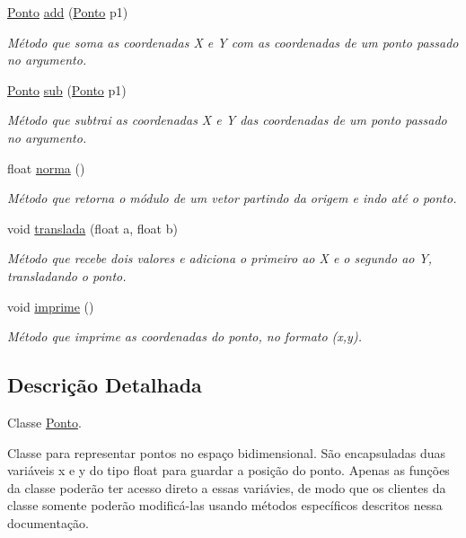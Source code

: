 \begin{DoxyCompactItemize}
\hyperlink{classPonto}{Ponto} \hyperlink{classPonto_abb68d6122278de262e8ed1c70714e3d9}{add} (\hyperlink{classPonto}{Ponto} p1)
\begin{DoxyCompactList}\small\item\em Método que soma as coordenadas X e Y com as coordenadas de um ponto passado no argumento. \end{DoxyCompactList}\item 
\hyperlink{classPonto}{Ponto} \hyperlink{classPonto_a8404fcad0fca2ce768ab9e1550f5d3a0}{sub} (\hyperlink{classPonto}{Ponto} p1)
\begin{DoxyCompactList}\small\item\em Método que subtrai as coordenadas X e Y das coordenadas de um ponto passado no argumento. \end{DoxyCompactList}\item 
float \hyperlink{classPonto_a9b0ddbdddd05edbc4d45ef0671a628c6}{norma} ()
\begin{DoxyCompactList}\small\item\em Método que retorna o módulo de um vetor partindo da origem e indo até o ponto. \end{DoxyCompactList}\item 
void \hyperlink{classPonto_a96a4395204ec010814e67d20705e630f}{translada} (float a, float b)
\begin{DoxyCompactList}\small\item\em Método que recebe dois valores e adiciona o primeiro ao X e o segundo ao Y, transladando o ponto. \end{DoxyCompactList}\item 
\mbox{\label{classPonto_a84758d453e38f237bdf860b6435e9def}} 
void \hyperlink{classPonto_a84758d453e38f237bdf860b6435e9def}{imprime} ()
\begin{DoxyCompactList}\small\item\em Método que imprime as coordenadas do ponto, no formato (x,y). \end{DoxyCompactList}\end{DoxyCompactItemize}


\subsection{Descrição Detalhada}
Classe \hyperlink{classPonto}{Ponto}. 

Classe para representar pontos no espaço bidimensional. São encapsuladas duas variáveis x e y do tipo float para guardar a posição do ponto. Apenas as funções da classe poderão ter acesso direto a essas variávies, de modo que os clientes da classe somente poderão modificá-\/las usando métodos específicos descritos nessa documentação. 

